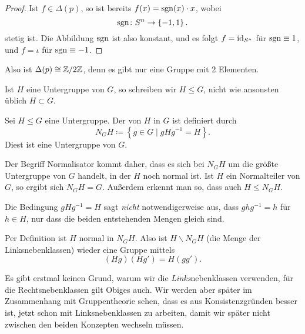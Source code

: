 \begin{example}
\begin{enumerate}[1)]
\begin{proof}
                Ist $f\in \Delta(p)$, so ist bereits $f(x) = \operatorname{sgn}(x) \cdot x$, wobei
                \[
                \operatorname{sgn} \colon  S^n \to  \left \{-1,1\right\} 
                .\] 
                stetig ist. Die Abbildung $\operatorname{sgn}$ ist also konstant, und es folgt  $f=\mathrm{id}_{S^n}$ für $\operatorname{sgn} \equiv 1$, und $f = ι$ für  $\operatorname{sgn} \equiv -1$.
            \end{proof}

            Also ist $\Delta(p) \cong \mathbb{Z} / 2\mathbb{Z}$, denn es gibt nur eine Gruppe mit 2 Elementen.
    \end{enumerate}
\end{example}

\begin{notation*}
    Ist $H$ eine Untergruppe von  $G$, so schreiben wir  $H \leq G$, nicht wie ansonsten üblich $H \subset G$.
\end{notation*}

\begin{definition}[Normalisator]\label{def:normalisator}
    Sei $H\leq  G$ eine Untergruppe. Der  von $H$ in  $G$ ist definiert durch
    \[
    N_GH \coloneqq  \left \{g\in G \mid  gH g^{-1} = H\right\} 
    .\] 
    Diest ist eine Untergruppe von $G$.
\end{definition}

\begin{remark*}
    Der Begriff Normalisator kommt daher, dass es sich bei $N_GH$ um die größte Untergruppe von  $G$ handelt, in der  $H$ noch normal ist. Ist  $H$ ein Normalteiler von  $G$, so ergibt sich  $N_GH = G$. Außerdem erkennt man so, dass auch  $H \leq  N_GH$.
\end{remark*}

\begin{remark}
    Die Bedingung $gH g^{-1} = H$ sagt \textit{nicht} notwendigerweise aus, dass $ghg^{-1} = h$ für $h\in H$, nur dass die beiden entstehenden Mengen gleich sind.    
\end{remark}

\begin{remark}
    Per Definition ist $H$ normal in  $N_GH$. Also ist $H \backslash N_GH$ (die Menge der Linksnebenklassen) wieder eine Gruppe mittels
    \[
        (Hg) (Hg') = H(gg')
    .\] 
\end{remark}

\begin{oral}
    Es gibt erstmal keinen Grund, warum wir die \textit{Links}nebenklassen verwenden, für die Rechtsnebenklassen gilt Obiges auch. Wir werden aber später im Zusammenhang mit Gruppentheorie sehen, dass es aus Konsistenzgründen besser ist, jetzt schon mit Linksnebenklassen zu arbeiten, damit wir später nicht zwischen den beiden Konzepten wechseln müssen.
\end{oral}

